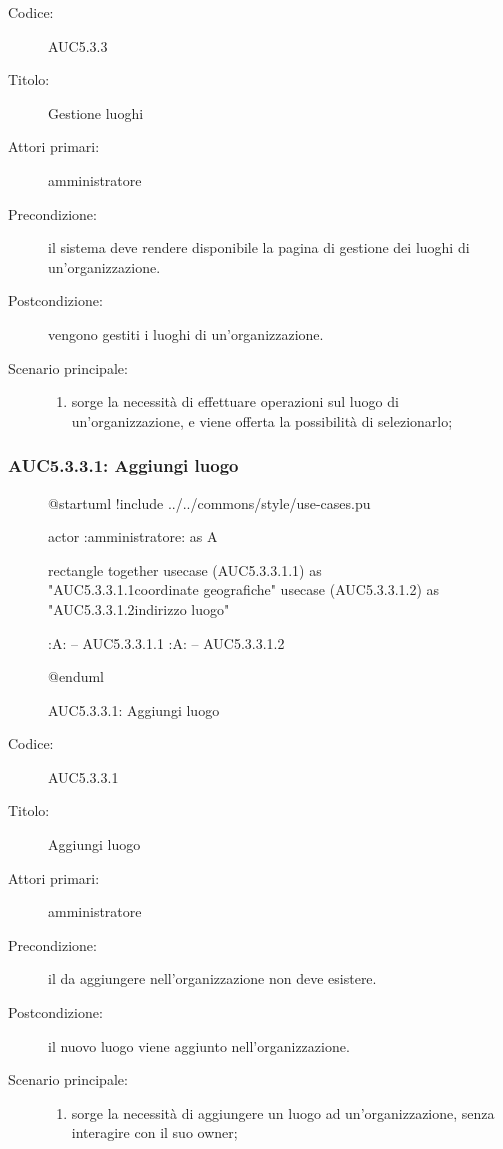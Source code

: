 \documentclass[../../../analisi-dei-requisiti.tex]{subfiles}
\begin{document}
\begin{description}
  \item[Codice:] AUC5.3.3
  \item[Titolo:] Gestione luoghi
  \item[Attori primari:] amministratore
  \item[Precondizione:] il sistema deve rendere disponibile la pagina di gestione dei luoghi di un'organizzazione.
  \item[Postcondizione:] vengono gestiti i luoghi di un'organizzazione.
  \item[Scenario principale:]
  \begin{enumerate}
    \item sorge la necessità di effettuare operazioni sul luogo di un'organizzazione, e viene offerta la possibilità di selezionarlo;
  \end{enumerate}
\end{description}

\subsubsection{AUC5.3.3.1: Aggiungi luogo}%
\label{subs:AUC5.3.3.1}

\begin{figure}[H]
  \centering
  \begin{plantuml}
  @startuml
  !include ../../commons/style/use-cases.pu

  actor :amministratore: as A

  rectangle {
    together {
      usecase (AUC5.3.3.1.1) as "AUC5.3.3.1.1\nInserisci coordinate geografiche"
      usecase (AUC5.3.3.1.2) as "AUC5.3.3.1.2\nInserisci indirizzo luogo"
    }
  }

  :A: -- AUC5.3.3.1.1
  :A: -- AUC5.3.3.1.2

  @enduml
  \end{plantuml}
  \caption{AUC5.3.3.1: Aggiungi luogo}
  \label{fig:AUC5_3_3_1}
\end{figure}

\begin{description}
  \item[Codice:] AUC5.3.3.1
  \item[Titolo:] Aggiungi luogo
  \item[Attori primari:] amministratore
  \item[Precondizione:] il  da aggiungere nell'organizzazione non deve esistere.
  \item[Postcondizione:] il nuovo luogo viene aggiunto nell'organizzazione.
  \item[Scenario principale:]
  \begin{enumerate}
    \item sorge la necessità di aggiungere un luogo ad un'organizzazione, senza interagire con il suo owner;
  \end{enumerate}
\end{description}
\end{document}
